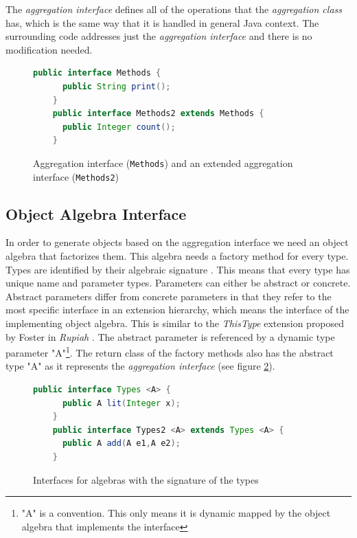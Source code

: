 \documentclass{report}
\begin{document}
The \emph{aggregation interface} defines all of the operations that the \emph{aggregation class} has, which is the same way that it is handled in general Java context. The surrounding code addresses just the \emph{aggregation interface} and there is no modification needed.

\begin{figure}[h]
\begin{lstlisting}[language=java]
    public interface Methods {
      public String print();
    }
    public interface Methods2 extends Methods {
      public Integer count();
    }
\end{lstlisting}
\caption{Aggregation interface (\lstinline{Methods}) and an extended aggregation interface (\lstinline{Methods2})}
\label{aggregationInterfaces}
\end{figure}

\subsection{Object Algebra Interface}

In order to generate objects based on the aggregation interface we need an object algebra that factorizes them. This algebra needs a factory method for every type. Types are identified by their algebraic signature \cite{Oliv-Extensibility-2012}. This means that every type has unique name and parameter types. Parameters can either be abstract or concrete. Abstract parameters differ from concrete parameters in that they refer to the most specific interface in an extension hierarchy, which means the interface of the implementing object algebra. This is similar to the \emph{ThisType} extension proposed by Foster in \emph{Rupiah} \cite{Foster-Rupiah-2001}. The abstract parameter is referenced by a dynamic type parameter "A"\footnote{"A" is a convention. This only means it is dynamic mapped by the object algebra that implements the interface}. The return class of the factory methods also has the abstract type "A" as it represents the \emph{aggregation interface} (see figure \ref{algebraInterfaces}).

\begin{figure}[h]
\begin{lstlisting}[language=java]
    public interface Types <A> {
      public A lit(Integer x);
    }
    public interface Types2 <A> extends Types <A> {
      public A add(A e1,A e2);
    }
\end{lstlisting}
\caption{Interfaces for algebras with the signature of the types}
\label{algebraInterfaces}
\end{figure}
\end{document}
